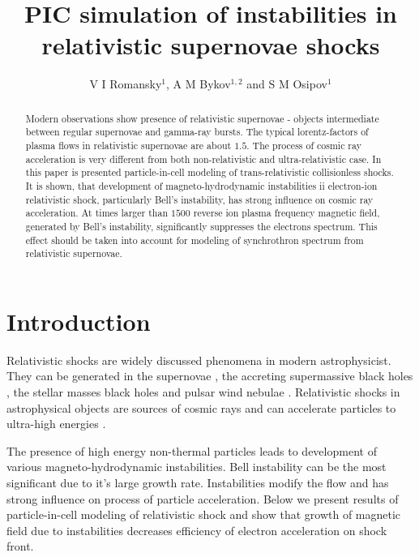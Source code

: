 \documentclass[a4paper]{jpconf}
\begin{document}
	\title{PIC simulation of instabilities in relativistic supernovae shocks}
	
	\author{V I Romansky$^{1}$, A M Bykov$^{1,2}$ and S M Osipov$^{1}$}
	
	\address{$^1$ Ioffe Institute, 26 Politekhnicheskaya st., St. Petersburg 194021, Russia}
	\address{$^2$ Peter the Great St. Petersburg Polytechnic University, 29 Politekhnicheskaya st., St. Petersburg 195251, Russia}
	
	
	\begin{abstract}
                 Modern observations show presence of relativistic supernovae - objects intermediate between regular supernovae and gamma-ray bursts. The typical lorentz-factors of plasma flows in relativistic supernovae are about $1.5$. The process of cosmic ray acceleration is very different from both non-relativistic and ultra-relativistic case. In this paper is presented particle-in-cell modeling of trans-relativistic collisionless shocks. It is shown, that development of magneto-hydrodynamic instabilities ii electron-ion relativistic shock, particularly Bell's instability, has strong influence on cosmic ray acceleration. At times larger than $1500$ reverse ion plasma frequency magnetic field, generated by Bell's instability, significantly suppresses the electrons spectrum. This effect should be taken into account for modeling of synchrothron spectrum from relativistic supernovae.
	\end{abstract}
	
	\section{Introduction}
	Relativistic shocks are widely discussed phenomena in modern astrophysicist. They can be generated in the supernovae \cite{2010Natur.463..513S,2007ApJ...667..351W}, the accreting supermassive black holes \cite{1984RvMP...56..255B}, the stellar masses black holes \cite{2019MmSAI..90...57M,1999PhR...314..575P,2014LNP...876.....R} and pulsar wind nebulae \cite{2019MNRAS.488.5690O,2017SSRv..207..235B,2017JPlPh..83e6301K,2019ApJ...876L...8B}. Relativistic shocks in astrophysical objects are sources of cosmic rays \cite{2012SSRv..173..309B,2015SSRv..191..519S,2017SSRv..207..319P} and can accelerate particles to ultra-high energies \cite{2009JCAP...11..009L}.
	
	The presence of high energy non-thermal particles leads to development of various magneto-hydrodynamic instabilities. Bell instability \cite{Bell04} can be the most significant due to it's large growth rate. Instabilities modify the flow and has strong influence on process of particle acceleration. Below we present results of particle-in-cell modeling of relativistic shock and show that growth of magnetic field due to instabilities decreases efficiency of electron acceleration on shock front.
	
\end{document}
